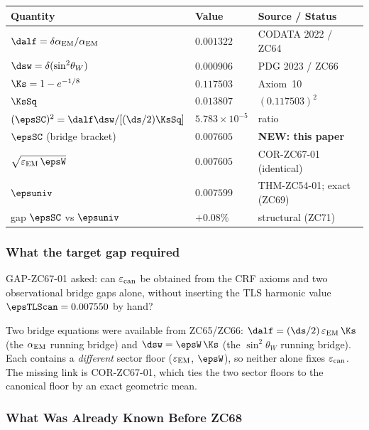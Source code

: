 \documentclass[12pt, a4paper]{article}
\renewcommand{\epsEM}{\varepsilon_{\rm EM}}
\renewcommand{\epscan}{\varepsilon_{\rm can}}
\renewcommand{\swsq}{\sin^2\!\theta_W}
\renewcommand{\aEM}{\alpha_{\rm EM}}
\begin{document}
\begin{keybox}[title={Numerical Summary --- ZC68 (T-canonical)}]
{\small\renewcommand{\arraystretch}{1.25}
\begin{center}
\begin{tabular}{@{}p{6.1cm}p{2.6cm}p{4.4cm}@{}}
\toprule
\textbf{Quantity} & \textbf{Value} & \textbf{Source / Status} \\
\midrule
$\dalf=\delta\aEM/\aEM$       & $0.001322$ & CODATA 2022 / ZC64 \\
$\dsw=\delta(\swsq)$          & $0.000906$ & PDG 2023 / ZC66 \\
$\Ks=1-e^{-1/8}$              & $0.117503$ & Axiom~10 \\
$\KsSq$                       & $0.013807$ & $(0.117503)^2$ \\
$(\epsSC)^2=\dalf\dsw/[(\ds/2)\KsSq]$ & $5.783\times10^{-5}$ & ratio \\
$\epsSC$ (bridge bracket)     & $\mathbf{0.007605}$ & \textbf{NEW: this paper} \\
$\sqrt{\epsEM\,\epsW}$        & $0.007605$ & COR-ZC67-01 (identical) \\
$\epsuniv$                    & $0.007599$ & THM-ZC54-01; exact (ZC69) \\
gap $\epsSC$ vs $\epsuniv$    & $+0.08\%$  & structural (ZC71) \\
\bottomrule
\end{tabular}
\end{center}}
\end{keybox}

\subsubsection{What the target gap required}

GAP-ZC67-01 asked: can $\epscan$ be obtained from the CRF axioms
and two observational bridge gaps alone, without inserting the
TLS harmonic value $\epsTLScan=0.007550$ by hand?

Two bridge equations were available from ZC65/ZC66:
$\dalf=(\ds/2)\,\epsEM\,\Ks$ (the $\aEM$ running bridge) and
$\dsw=\epsW\,\Ks$ (the $\swsq$ running bridge). Each contains a
\emph{different} sector floor ($\epsEM$, $\epsW$), so neither alone
fixes $\epscan$. The missing link is COR-ZC67-01, which ties the two
sector floors to the canonical floor by an exact geometric mean.

\subsubsection{What Was Already Known Before ZC68}
\end{document}
